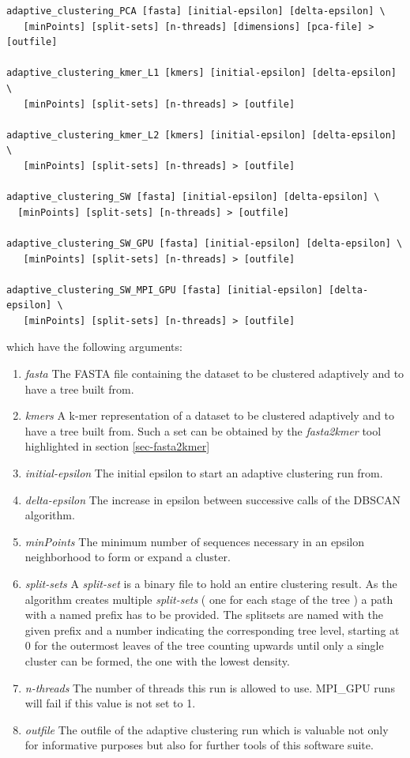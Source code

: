 \begin{lstlisting}
adaptive_clustering_PCA [fasta] [initial-epsilon] [delta-epsilon] \
   [minPoints] [split-sets] [n-threads] [dimensions] [pca-file] > [outfile]

adaptive_clustering_kmer_L1 [kmers] [initial-epsilon] [delta-epsilon] \
   [minPoints] [split-sets] [n-threads] > [outfile]

adaptive_clustering_kmer_L2 [kmers] [initial-epsilon] [delta-epsilon] \
   [minPoints] [split-sets] [n-threads] > [outfile]

adaptive_clustering_SW [fasta] [initial-epsilon] [delta-epsilon] \
  [minPoints] [split-sets] [n-threads] > [outfile]

adaptive_clustering_SW_GPU [fasta] [initial-epsilon] [delta-epsilon] \
   [minPoints] [split-sets] [n-threads] > [outfile]

adaptive_clustering_SW_MPI_GPU [fasta] [initial-epsilon] [delta-epsilon] \
   [minPoints] [split-sets] [n-threads] > [outfile]
\end{lstlisting}
which have the following arguments:
\begin{enumerate}
  \item \emph{fasta} The FASTA file containing the dataset to be
    clustered adaptively and to have a tree built from.
  \item \emph{kmers} A k-mer representation of a dataset to be
    clustered adaptively and to have a tree built from. Such a set can
    be obtained by the \emph{fasta2kmer} tool highlighted in section
    \ref{sec-fasta2kmer}
  \item \emph{initial-epsilon} The initial epsilon to start an adaptive
    clustering run from.
  \item \emph{delta-epsilon} The increase in epsilon between
    successive calls of the DBSCAN algorithm.
  \item \emph{minPoints} The minimum number of sequences necessary
    in an epsilon neighborhood to form or expand a cluster.
  \item \emph{split-sets} A \emph{split-set} is a binary file to hold
    an entire clustering result.
    As the algorithm creates multiple \emph{split-sets} ( one for
    each stage of the tree ) a path with a named prefix has to be
    provided. The splitsets are named with the given prefix and a
    number indicating the corresponding tree level, starting at 0 for
    the outermost leaves 
    of the tree counting upwards until only a single cluster can be
    formed, the one with the lowest density.
  \item \emph{n-threads} The number of threads this run is allowed
    to use. MPI\_GPU runs will fail if this value is not set to 1.
  \item \emph{outfile} The outfile of the adaptive clustering run
    which is valuable not only for informative purposes but also for
    further tools of this software suite.
\end{enumerate}

